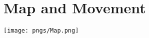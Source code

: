 \documentclass{article}
\begin{document}
\section{Map and Movement}
\texttt{[image: pngs/Map.png]}
\end{document}
